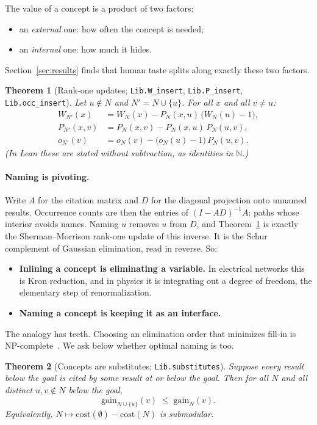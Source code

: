 \documentclass[11pt]{article}
\newtheorem{theorem}{Theorem}
\theoremstyle{remark}
\newcommand{\lean}[1]{\texttt{#1}}
\begin{document}
\noindent The value of a concept is a product of two factors:
\begin{itemize}
\item an \emph{external} one: how often the concept is needed;
\item an \emph{internal} one: how much it hides.
\end{itemize}
Section~\ref{sec:results} finds that human taste splits along exactly these two factors.

\begin{theorem}[Rank-one updates; \lean{Lib.W\_insert}, \lean{Lib.P\_insert}, \lean{Lib.occ\_insert}]\label{thm:rank1}
Let $u\notin N$ and $N'=N\cup\{u\}$. For all $x$ and all $v\neq u$:
\begin{align*}
W_{N'}(x) &= W_N(x) - P_N(x,u)\,\bigl(W_N(u)-1\bigr),\\
P_{N'}(x,v) &= P_N(x,v) - P_N(x,u)\,P_N(u,v),\\
o_{N'}(v) &= o_N(v) - \bigl(o_N(u)-1\bigr)\,P_N(u,v).
\end{align*}
(In Lean these are stated without subtraction, as identities in $\mathbb N$.)
\end{theorem}

\paragraph{Naming is pivoting.} Write $A$ for the citation matrix and $D$ for the diagonal
projection onto unnamed results. Occurrence counts are then the entries of
$(I-AD)^{-1}A$: paths whose interior avoids names. Naming $u$ removes $u$ from $D$, and
Theorem~\ref{thm:rank1} is exactly the Sherman--Morrison rank-one update of this inverse.
It is the Schur complement of Gaussian elimination, read in reverse. So:
\begin{itemize}
\item \textbf{Inlining a concept is eliminating a variable.} In electrical networks this
  is Kron reduction, and in physics it is integrating out a degree of freedom, the
  elementary step of renormalization.
\item \textbf{Naming a concept is keeping it as an interface.}
\end{itemize}
The analogy has teeth. Choosing an elimination order that minimizes fill-in is
NP-complete~\cite{yannakakis}. We ask below whether optimal naming is too.

\begin{theorem}[Concepts are substitutes; \lean{Lib.substitutes}]\label{thm:sub}
Suppose every result below the goal is cited by some result at or below the goal. Then for
all $N$ and all distinct $u,v\notin N$ below the goal,
\[
\mathrm{gain}_{N\cup\{u\}}(v)\;\le\;\mathrm{gain}_N(v).
\]
Equivalently, $N\mapsto\mathrm{cost}(\emptyset)-\mathrm{cost}(N)$ is submodular.
\end{theorem}
\end{document}

